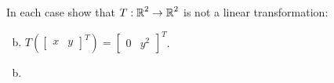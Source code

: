 \documentclass[../main.tex]{subfiles}
\begin{document}
In each case show that $T: \operatorname{\mathbb{R}}^2 \to \operatorname{\mathbb{R}}^2$ is not a linear transformation:
\begin{enumerate}[a)]
	\setcounter{enumi}{1}
	\item $T(\begin{bmatrix}x&y\end{bmatrix}^T) = \begin{bmatrix}0&y^2\end{bmatrix}^T$.
\end{enumerate}

\solution
\begin{enumerate}[a)]
	\setcounter{enumi}{1}
	\item 
\end{enumerate}
\end{document}
